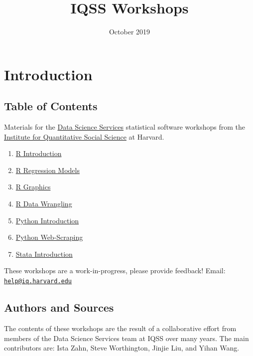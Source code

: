 \documentclass[]{book}
\title{IQSS Workshops}
\author{}
\date{October 2019}
\providecommand{\tightlist}{%
  \setlength{\itemsep}{0pt}\setlength{\parskip}{0pt}}
\begin{document}
\maketitle

{
\setcounter{tocdepth}{1}
\tableofcontents
}
\chapter*{Introduction}\label{introduction}

\section*{Table of Contents}\label{table-of-contents}

Materials for the \href{http://dss.iq.harvard.edu}{Data Science
Services} statistical software workshops from the
\href{http://iq.harvard.edu}{Institute for Quantitative Social Science}
at Harvard.

\begin{enumerate}
\def\labelenumi{\arabic{enumi}.}
\tightlist
\item
  \href{./Rintro.html}{R Introduction}
\item
  \href{./Rmodels.html}{R Regression Models}
\item
  \href{./Rgraphics.html}{R Graphics}
\item
  \href{./RDataWrangling.html}{R Data Wrangling}
\item
  \href{./PythonIntro.html}{Python Introduction}
\item
  \href{./PythonWebScrape.html}{Python Web-Scraping}
\item
  \href{./StataIntro.html}{Stata Introduction}
\end{enumerate}

These workshops are a work-in-progress, please provide feedback! Email:
\href{mailto:help@iq.harvard.edu}{\nolinkurl{help@iq.harvard.edu}}

\section*{Authors and Sources}\label{authors-and-sources}

The contents of these workshops are the result of a collaborative effort
from members of the Data Science Services team at IQSS over many years.
The main contributors are: Ista Zahn, Steve Worthington, Jinjie Liu, and
Yihan Wang.
\end{document}
